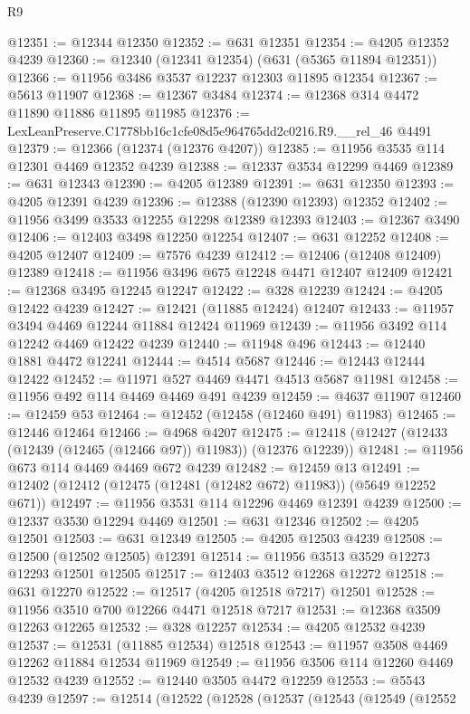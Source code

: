 \begin{lexlean}{R9}
\begin{coremodule}
@12351 := @12344 @12350
@12352 := @631 @12351
@12354 := @4205 @12352 @4239
@12360 := @12340 (@12341 @12354) (@631 (@5365 @11894 @12351))
@12366 := @11956 @3486 @3537 @12237 @12303 @11895 @12354
@12367 := @5613 @11907
@12368 := @12367 @3484
@12374 := @12368 @314 @4472 @11890 @11886 @11895 @11985
@12376 := LexLeanPreserve.C1778bb16c1cfe08d5e964765dd2c0216.R9.__rel_46 @4491
@12379 := @12366 (@12374 (@12376 @4207))
@12385 := @11956 @3535 @114 @12301 @4469 @12352 @4239
@12388 := @12337 @3534 @12299 @4469
@12389 := @631 @12343
@12390 := @4205 @12389
@12391 := @631 @12350
@12393 := @4205 @12391 @4239
@12396 := @12388 (@12390 @12393) @12352
@12402 := @11956 @3499 @3533 @12255 @12298 @12389 @12393
@12403 := @12367 @3490
@12406 := @12403 @3498 @12250 @12254
@12407 := @631 @12252
@12408 := @4205 @12407
@12409 := @7576 @4239
@12412 := @12406 (@12408 @12409) @12389
@12418 := @11956 @3496 @675 @12248 @4471 @12407 @12409
@12421 := @12368 @3495 @12245 @12247
@12422 := @328 @12239
@12424 := @4205 @12422 @4239
@12427 := @12421 (@11885 @12424) @12407
@12433 := @11957 @3494 @4469 @12244 @11884 @12424 @11969
@12439 := @11956 @3492 @114 @12242 @4469 @12422 @4239
@12440 := @11948 @496
@12443 := @12440 @1881 @4472 @12241
@12444 := @4514 @5687
@12446 := @12443 @12444 @12422
@12452 := @11971 @527 @4469 @4471 @4513 @5687 @11981
@12458 := @11956 @492 @114 @4469 @4469 @491 @4239
@12459 := @4637 @11907
@12460 := @12459 @53
@12464 := @12452 (@12458 (@12460 @491) @11983)
@12465 := @12446 @12464
@12466 := @4968 @4207
@12475 := @12418 (@12427 (@12433 (@12439 (@12465 (@12466 @97)) @11983)) (@12376 @12239))
@12481 := @11956 @673 @114 @4469 @4469 @672 @4239
@12482 := @12459 @13
@12491 := @12402 (@12412 (@12475 (@12481 (@12482 @672) @11983)) (@5649 @12252 @671))
@12497 := @11956 @3531 @114 @12296 @4469 @12391 @4239
@12500 := @12337 @3530 @12294 @4469
@12501 := @631 @12346
@12502 := @4205 @12501
@12503 := @631 @12349
@12505 := @4205 @12503 @4239
@12508 := @12500 (@12502 @12505) @12391
@12514 := @11956 @3513 @3529 @12273 @12293 @12501 @12505
@12517 := @12403 @3512 @12268 @12272
@12518 := @631 @12270
@12522 := @12517 (@4205 @12518 @7217) @12501
@12528 := @11956 @3510 @700 @12266 @4471 @12518 @7217
@12531 := @12368 @3509 @12263 @12265
@12532 := @328 @12257
@12534 := @4205 @12532 @4239
@12537 := @12531 (@11885 @12534) @12518
@12543 := @11957 @3508 @4469 @12262 @11884 @12534 @11969
@12549 := @11956 @3506 @114 @12260 @4469 @12532 @4239
@12552 := @12440 @3505 @4472 @12259
@12553 := @5543 @4239
@12597 := @12514
    (@12522
      (@12528
        (@12537
          (@12543
            (@12549
              (@12552

\end{coremodule}
\end{lexlean}
